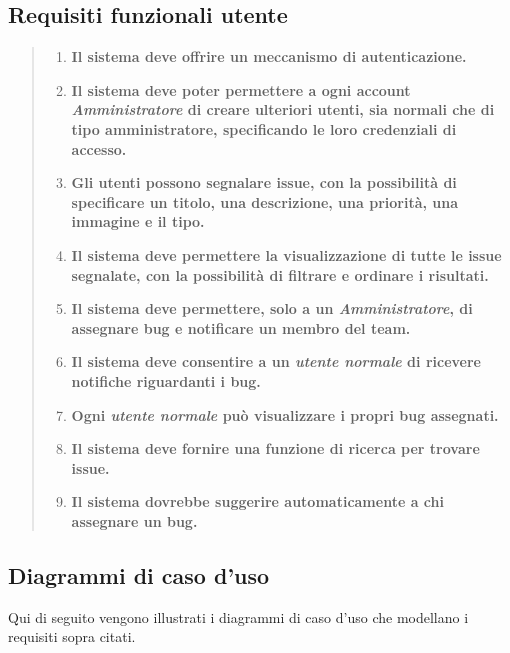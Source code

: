 \subsection{Requisiti funzionali utente}
\begin{quote}
\begin{enumerate}[label=\textit{RF\arabic*}]
  \item \textbf{Il sistema deve offrire un meccanismo di autenticazione.}
    
  \item \textbf{Il sistema deve poter permettere a ogni account \textit{Amministratore} di creare ulteriori utenti, sia normali che di tipo amministratore, specificando le loro credenziali di accesso. }
  
  \item \textbf{Gli utenti possono segnalare issue, con la possibilità di specificare un titolo, una descrizione, una priorità, una immagine e il tipo.}
  
  \item \textbf{Il sistema deve permettere la visualizzazione di tutte le issue segnalate, con la possibilità di filtrare e ordinare i risultati.}
  
  \item \textbf{Il sistema deve permettere, solo a un \textit{Amministratore}, di assegnare bug e notificare un membro del team.}
  
  \item \textbf{Il sistema deve consentire a un \textit{utente normale} di ricevere notifiche riguardanti i bug.}

  \item \textbf{Ogni \textit{utente normale} può visualizzare i propri bug assegnati.}

  \item \textbf{Il sistema deve fornire una funzione di ricerca per trovare issue.}

  \item \textbf{Il sistema dovrebbe suggerire  automaticamente a chi assegnare un bug.}
  
\end{enumerate} 
\end{quote}

\subsection{Diagrammi di caso d'uso} 

Qui di seguito vengono illustrati i diagrammi di caso d'uso che modellano i requisiti sopra citati.

